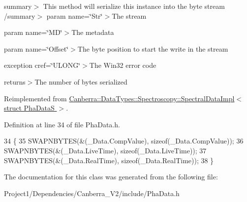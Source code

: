 summary$>$ This method will serialize this instance into the byte stream /summary$>$ param name=\char`\"{}\+Str\char`\"{}$>$The stream

param name=\char`\"{}\+M\+D\char`\"{}$>$The metadata

param name=\char`\"{}\+Offset\char`\"{}$>$The byte position to start the write in the stream

exception cref=\char`\"{}\+U\+L\+O\+N\+G\char`\"{}$>$The Win32 error code

returns$>$The number of bytes serialized

Reimplemented from \hyperlink{class_canberra_1_1_data_types_1_1_spectroscopy_1_1_spectral_data_impl_add8a76fab9523229280ad47efb9b5bf0_add8a76fab9523229280ad47efb9b5bf0}{Canberra\+::\+Data\+Types\+::\+Spectroscopy\+::\+Spectral\+Data\+Impl$<$ struct Pha\+Data\+S $>$}.



Definition at line 34 of file Pha\+Data.\+h.


\begin{DoxyCode}
34                                         \{
35                     SWAPNBYTES(&(\_Data.CompValue), \textcolor{keyword}{sizeof}(\_Data.CompValue));
36                     SWAPNBYTES(&(\_Data.LiveTime), \textcolor{keyword}{sizeof}(\_Data.LiveTime));
37                     SWAPNBYTES(&(\_Data.RealTime), \textcolor{keyword}{sizeof}(\_Data.RealTime));
38                 \}
\end{DoxyCode}


The documentation for this class was generated from the following file\+:\begin{DoxyCompactItemize}
\item 
Project1/\+Dependencies/\+Canberra\+\_\+\+V2/include/Pha\+Data.\+h\end{DoxyCompactItemize}
